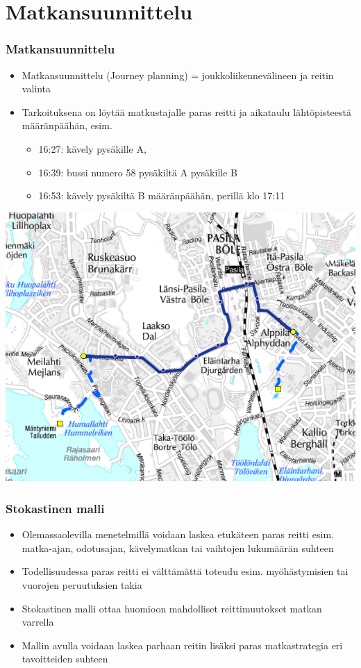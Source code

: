 \documentclass{beamer}
\begin{document}
\section{Matkansuunnittelu}
\begin{frame}
  \frametitle{Matkansuunnittelu} 
  \begin{itemize}
   \item 
    Matkansuunnittelu (Journey planning) = joukkoliikennevälineen ja reitin valinta
    \item
    Tarkoituksena on löytää matkustajalle paras reitti ja aikataulu lähtöpisteestä määränpäähän, esim.
    \begin{itemize}
     \item 
     16:27: kävely pysäkille A,
     \item
     16:39: bussi numero 58 pysäkiltä A pysäkille B
     \item
     16:53: kävely pysäkiltä B määränpäähän, perillä klo 17:11
    \end{itemize}
   \end{itemize}
     \begin{center}
      \includegraphics[scale=0.2]{reittiopas01}
      \end{center}
\end{frame} 

\begin{frame}
  \frametitle{Stokastinen malli} 
  \begin{itemize}
   \item 
    Olemassaolevilla menetelmillä voidaan laskea etukäteen paras reitti esim. matka-ajan, odotusajan, kävelymatkan tai vaihtojen lukumäärän suhteen 
    \item
    Todellisuudessa paras reitti ei välttämättä toteudu esim. myöhästymisien tai vuorojen peruutuksien takia
    \item
    Stokastinen malli ottaa huomioon mahdolliset reittimuutokset matkan varrella
    \item
    Mallin avulla voidaan laskea parhaan reitin lisäksi paras matkastrategia eri tavoitteiden suhteen
   \end{itemize}
     \begin{center}
      \end{center}
\end{frame} 
\end{document}

